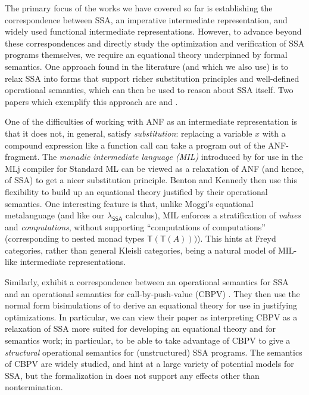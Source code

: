 \documentclass[acmsmall,screen,review]{acmart}
\newcommand{\ms}[1]{\ensuremath{\mathsf{#1}}}
\newcommand{\isotopessa}{\(\lambda_{\ms{SSA}}\)}
\begin{document}
The primary focus of the works we have covered so far is establishing the correspondence between
SSA, an imperative intermediate representation, and widely used functional intermediate
representations. However, to advance beyond these correspondences and directly study the
optimization and verification of SSA programs themselves, we require an equational theory
underpinned by formal semantics. One approach found in the literature (and which we also use) is
to relax SSA into forms that support richer substitution principles and well-defined operational
semantics, which can then be used to reason about SSA itself. Two papers which exemplify this
approach are \citet{benton-kennedy-99} and \citet{garbuzov-structural-cfg-2018}.

One of the difficulties of working with ANF as an intermediate representation is that it does not,
in general, satisfy \emph{substitution}: replacing a variable $x$ with a compound expression like a
function call can take a program out of the ANF-fragment. The \emph{monadic intermediate language
(MIL)} introduced by \citet{benton-kennedy-99} for use in the MLj compiler for Standard ML can be
viewed as a relaxation of ANF (and hence, of SSA) to get a nicer substitution principle. Benton and
Kennedy then use this flexibility to build up an equational theory justified by their operational
semantics. One interesting feature is that, unlike Moggi's equational metalanguage
\cite{moggi-91-monad} (and like our \isotopessa{} calculus), MIL enforces a stratification of
\emph{values} and \emph{computations}, without supporting ``computations of computations''
(corresponding to nested monad types $\ms{T}(\ms{T}(A)))$). This hints at Freyd categories, rather
than general Kleisli categories, being a natural model of MIL-like intermediate representations.

Similarly, \citet{garbuzov-structural-cfg-2018} exhibit a correspondence between an operational
semantics for SSA and an operational semantics for call-by-push-value (CBPV) \cite{cbpv}. They then
use the normal form bisimulations of \citet{lassen-bisim} to derive an equational theory for use in
justifying optimizations. In particular, we can view their paper as interpreting CBPV as a
relaxation of SSA more suited for developing an equational theory and for semantics work; in
particular, to be able to take advantage of CBPV to give a \emph{structural} operational semantics
for (unstructured) SSA programs. The semantics of CBPV are widely studied, and hint at a large
variety of potential models for SSA, but the formalization in \cite{garbuzov-structural-cfg-2018}
does not support any effects other than nontermination.
\end{document}
